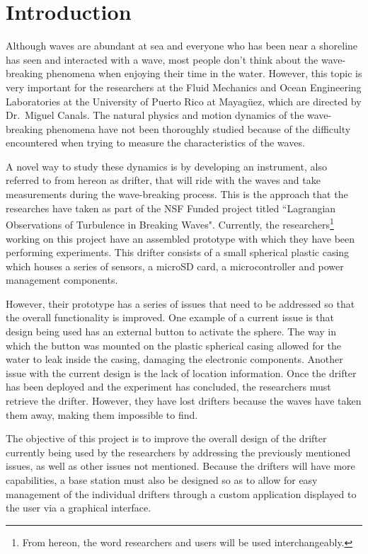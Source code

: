 \section{Introduction}

Although waves are abundant at sea and everyone who has been near a shoreline has seen and interacted with a wave, most people don't think about the wave-breaking phenomena when enjoying their time in the water.  However, this topic is very important for the researchers at the Fluid Mechanics and Ocean Engineering Laboratories at the University of Puerto Rico at Mayag\"uez, which are directed by Dr.~Miguel Canals.  The natural physics and motion dynamics of the wave-breaking phenomena have not been thoroughly studied because of the difficulty encountered when trying to measure the characteristics of the waves.

A novel way to study these dynamics is by developing an instrument, also referred to from hereon as drifter, that will ride with the waves and take measurements during the wave-breaking process.  This is the approach that the researches have taken as part of the NSF Funded project titled ``Lagrangian Observations of Turbulence in Breaking Waves".  Currently, the researchers\footnote{From hereon, the word researchers and users will be used interchangeably.} working on this project have an assembled prototype with which they have been performing experiments. This drifter consists of a small spherical plastic casing which houses a series of sensors, a microSD card, a microcontroller and power management components.

However, their prototype has a series of issues that need to be addressed so that the overall functionality is improved.  One example of a current issue is that design being used has an external button to activate the sphere.  The way in which the button was mounted on the plastic spherical casing allowed for the water to leak inside the casing, damaging the electronic components.  Another issue with the current design is the lack of location information. Once the drifter has been deployed and the experiment has concluded, the researchers must retrieve the drifter.  However, they have lost drifters because the waves have taken them away, making them impossible to find.

The objective of this project is to improve the overall design of the drifter currently being used by the researchers by addressing the previously mentioned issues, as well as other issues not mentioned.  Because the drifters will have more capabilities, a base station must also be designed so as to allow for easy management of the individual drifters through a custom application displayed to the user via a graphical interface. 

